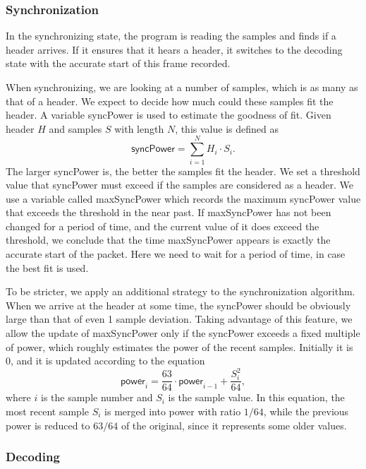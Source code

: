 \documentclass[11pt, conference]{IEEEtran}
\begin{document}
\subsubsection{Synchronization}

In the synchronizing state, the program is reading the samples and finds if a header arrives. If it ensures that it hears a header, it switches to the decoding state with the accurate start of this frame recorded.

When synchronizing, we are looking at a number of samples, which is as many as that of a header. We expect to decide how much could these samples fit the header. A variable \textsf{syncPower} is used to estimate the goodness of fit. Given header $H$ and samples $S$ with length $N$, this value is defined as
\[
\textsf{syncPower} = \sum_{i=1}^N H_i \cdot S_i.
\]
The larger \textsf{syncPower} is, the better the samples fit the header. We set a threshold value that \textsf{syncPower} must exceed if the samples are considered as a header. We use a variable called \textsf{maxSyncPower} which records the maximum \textsf{syncPower} value that exceeds the threshold in the near past. If \textsf{maxSyncPower} has not been changed for a period of time, and the current value of it does exceed the threshold, we conclude that the time \textsf{maxSyncPower} appears is exactly the accurate start of the packet. Here we need to wait for a period of time, in case the best fit is used.

To be stricter, we apply an additional strategy to the synchronization algorithm. When we arrive at the header at some time, the \textsf{syncPower} should be obviously large than that of even 1 sample deviation. Taking advantage of this feature, we allow the update of \textsf{maxSyncPower} only if the \textsf{syncPower} exceeds a fixed multiple of \textsf{power}, which roughly estimates the power of the recent samples. Initially it is $0$, and it is updated according to the equation
\[
\textsf{power}_i = \frac{63}{64} \cdot \textsf{power}_{i-1} + \frac{S_i^2}{64},
\]
where $i$ is the sample number and $S_i$ is the sample value. In this equation, the most recent sample $S_i$ is merged into \textsf{power} with ratio $1/64$, while the previous \textsf{power} is reduced to $63/64$ of the original, since it represents some older values.

\subsubsection{Decoding}
\end{document}
